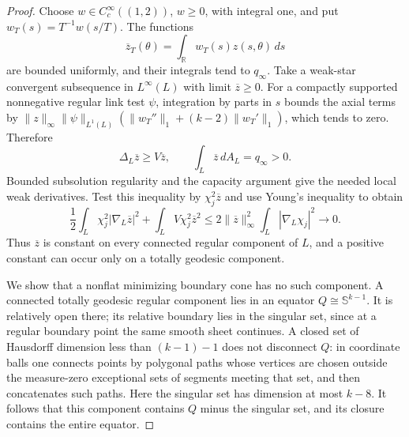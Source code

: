 \begin{proof}
Choose $w\in C_c^\infty((1,2))$, $w\geq0$, with integral one, and
put $w_T(s)=T^{-1}w(s/T)$.  The functions
\begin{equation}\label{var:forward-average}
 \overline z_T(\theta)=\int_{\mathbb R}w_T(s)z(s,\theta)\,ds
\end{equation}
are bounded uniformly, and their integrals tend to $q_\infty$.
Take a weak-star convergent subsequence in $L^\infty(L)$ with limit
$\overline z\geq0$.  For a compactly supported nonnegative regular
link test $\psi$, integration by parts in $s$ bounds the axial terms by
$\|z\|_\infty\|\psi\|_{L^1(L)}(\|w_T''\|_1+(k-2)\|w_T'\|_1)$, which tends to zero.
Therefore
\begin{equation}\label{var:averaged-link-inequality}
 \Delta_L\overline z\geq V\overline z,
 \qquad \int_L\overline z\,dA_L=q_\infty>0.
\end{equation}
Bounded subsolution regularity and the capacity argument give the
needed local weak derivatives.  Test this inequality by
$\chi_j^2\overline z$ and use Young's inequality to obtain
\begin{equation}\label{var:link-energy-vanishing}
 \frac12\int_L\chi_j^2|\nabla_L\overline z|^2
       +\int_LV\chi_j^2\overline z^2
 \leq2\|\overline z\|_\infty^2
                  \int_L|\nabla_L\chi_j|^2\longrightarrow0.
\end{equation}
Thus $\overline z$ is constant on every connected regular component
of $L$, and a positive constant can occur only on a totally geodesic
component.

We show that a nonflat minimizing boundary cone has no such
component.  A connected totally geodesic regular component lies in
an equator $Q\cong\mathbb S^{k-1}$.  It is relatively open there;
its relative boundary lies in the singular set, since at a regular
boundary point the same smooth sheet continues.  A closed set of
Hausdorff dimension less than $(k-1)-1$ does not disconnect $Q$:
in coordinate balls one connects points by polygonal paths whose
vertices are chosen outside the measure-zero exceptional sets of
segments meeting that set, and then concatenates such paths.
Here the singular set has dimension at most $k-8$.
It follows that this component contains $Q$ minus the singular set,
and its closure contains the entire equator.


\end{proof}
